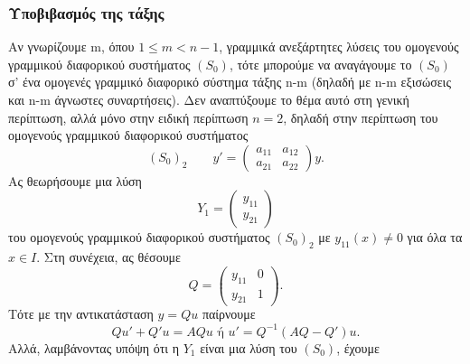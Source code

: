 \documentclass[11pt,a4paper,twoside]{book}
\begin{document}
\subsubsection{Υποβιβασμός της τάξης}
Αν γνωρίζουμε m, όπου $1 \le m < n-1$, γραμμικά ανεξάρτητες λύσεις του ομογενούς γραμμικού διαφορικού συστήματος $(S_0)$, τότε μπορούμε να αναγάγουμε το $(S_0)$ σ' ένα ομογενές γραμμικό διαφορικό σύστημα τάξης n-m (δηλαδή με n-m εξισώσεις και n-m άγνωστες συναρτήσεις). Δεν αναπτύξουμε το θέμα αυτό στη γενική περίπτωση, αλλά μόνο στην ειδική περίπτωση $n=2$, δηλαδή στην περίπτωση του ομογενούς γραμμικού διαφορικού συστήματος
\[
(S_0)_2 \qquad y' = 
\begin{pmatrix}
a_{11} & a_{12} \\
a_{21} & a_{22}
\end{pmatrix}
y.
\]
Ας θεωρήσουμε μια λύση
\[
Y_1 = 
\begin{pmatrix}
y_{11} \\
y_{21}
\end{pmatrix}
\]
του ομογενούς γραμμικού διαφορικού συστήματος $(S_0)_2$ με $y_{11}(x) \neq 0$ για όλα τα $x \in I$. Στη συνέχεια, ας θέσουμε
\[
Q =
\begin{pmatrix}
y_{11} & 0 \\
y_{21} & 1
\end{pmatrix}
.
\]
Τότε με την αντικατάσταση $y=Qu$ παίρνουμε
\[
Qu' + Q'u = AQu \text{ ή } u' = Q^{-1}(AQ-Q')u.
\]
Αλλά, λαμβάνοντας υπόψη ότι η $Y_1$ είναι μια λύση του $(S_0)$, έχουμε
\end{document}
